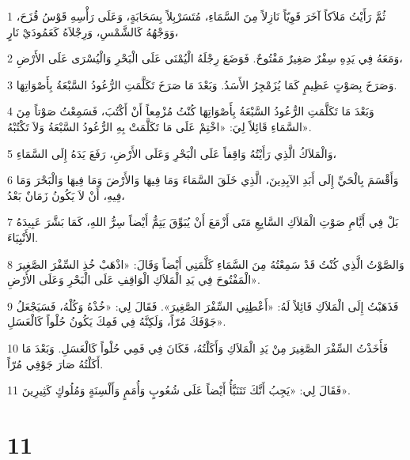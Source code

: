 \par 1 ثُمَّ رَأَيْتُ مَلاَكاً آخَرَ قَوِيّاً نَازِلاً مِنَ السَّمَاءِ، مُتَسَرْبِلاً بِسَحَابَةٍ، وَعَلَى رَأْسِهِ قَوْسُ قُزَحَ، وَوَجْهُهُ كَالشَّمْسِ، وَرِجْلاَهُ كَعَمُودَيْ نَارٍ،
\par 2 وَمَعَهُ فِي يَدِهِ سِفْرٌ صَغِيرٌ مَفْتُوحٌ. فَوَضَعَ رِجْلَهُ الْيُمْنَى عَلَى الْبَحْرِ وَالْيُسْرَى عَلَى الأَرْضِ،
\par 3 وَصَرَخَ بِصَوْتٍ عَظِيمٍ كَمَا يُزَمْجِرُ الأَسَدُ. وَبَعْدَ مَا صَرَخَ تَكَلَّمَتِ الرُّعُودُ السَّبْعَةُ بِأَصْوَاتِهَا.
\par 4 وَبَعْدَ مَا تَكَلَّمَتِ الرُّعُودُ السَّبْعَةُ بِأَصْوَاتِهَا كُنْتُ مُزْمِعاً أَنْ أَكْتُبَ، فَسَمِعْتُ صَوْتاً مِنَ السَّمَاءِ قَائِلاً لِيَ: «اخْتِمْ عَلَى مَا تَكَلَّمَتْ بِهِ الرُّعُودُ السَّبْعَةُ وَلاَ تَكْتُبْهُ».
\par 5 وَالْمَلاَكُ الَّذِي رَأَيْتُهُ وَاقِفاً عَلَى الْبَحْرِ وَعَلَى الأَرْضِ، رَفَعَ يَدَهُ إِلَى السَّمَاءِ،
\par 6 وَأَقْسَمَ بِالْحَيِّ إِلَى أَبَدِ الآبِدِينَ، الَّذِي خَلَقَ السَّمَاءَ وَمَا فِيهَا وَالأَرْضَ وَمَا فِيهَا وَالْبَحْرَ وَمَا فِيهِ، أَنْ لاَ يَكُونُ زَمَانٌ بَعْدُ،
\par 7 بَلْ فِي أَيَّامِ صَوْتِ الْمَلاَكِ السَّابِعِ مَتَى أَزْمَعَ أَنْ يُبَوِّقَ يَتِمُّ أَيْضاً سِرُّ اللهِ، كَمَا بَشَّرَ عَبِيدَهُ الأَنْبِيَاءَ.
\par 8 وَالصَّوْتُ الَّذِي كُنْتُ قَدْ سَمِعْتُهُ مِنَ السَّمَاءِ كَلَّمَنِي أَيْضاً وَقَالَ: «اذْهَبْ خُذِ السِّفْرَ الصَّغِيرَ الْمَفْتُوحَ فِي يَدِ الْمَلاَكِ الْوَاقِفِ عَلَى الْبَحْرِ وَعَلَى الأَرْضِ».
\par 9 فَذَهَبْتُ إِلَى الْمَلاَكِ قَائِلاً لَهُ: «أَعْطِنِي السِّفْرَ الصَّغِيرَ». فَقَالَ لِي: «خُذْهُ وَكُلْهُ، فَسَيَجْعَلُ جَوْفَكَ مُرّاً، وَلَكِنَّهُ فِي فَمِكَ يَكُونُ حُلْواً كَالْعَسَلِ».
\par 10 فَأَخَذْتُ السِّفْرَ الصَّغِيرَ مِنْ يَدِ الْمَلاَكِ وَأَكَلْتُهُ، فَكَانَ فِي فَمِي حُلْواً كَالْعَسَلِ. وَبَعْدَ مَا أَكَلْتُهُ صَارَ جَوْفِي مُرّاً.
\par 11 فَقَالَ لِي: «يَجِبُ أَنَّكَ تَتَنَبَّأُ أَيْضاً عَلَى شُعُوبٍ وَأُمَمٍ وَأَلْسِنَةٍ وَمُلُوكٍ كَثِيرِينَ».

\chapter{11}

